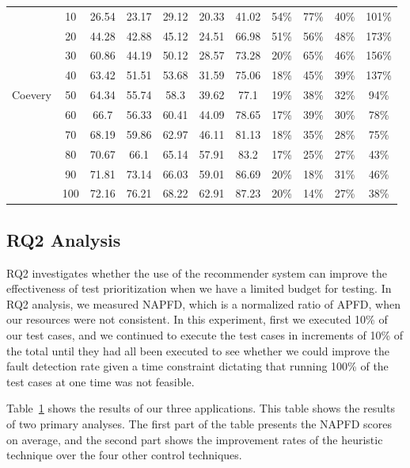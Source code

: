 \begin{table}[!ht]
\begin{center}
\begin{tabular}{|c|c|c|c|c|c|c||c|c|c|c|}
&10	&26.54	&23.17	&29.12	&20.33	&41.02	&54\%	&77\%	&40\%&	101\%	\\
&20	&44.28	&42.88	&45.12	&24.51	&66.98	&51\%	&56\%	&48\%	&173\%\\
&30	&60.86	&44.19	&50.12	&28.57	&73.28	&20\%	&65\%	&46\%	&156\%	\\
&40	&63.42	&51.51	&53.68	&31.59	&75.06	&18\%	&45\%	&39\%	&137\%	\\
Coevery &50	&64.34	&55.74	&58.3	&39.62	&77.1	&19\%	&38\% 	&32\%&	94\%	\\
&60	&66.7	&56.33	&60.41	&44.09	&78.65	&17\%	&39\% 	&30\%	&78\%\\
&70	&68.19	&59.86	&62.97	&46.11	&81.13	&18\%	&35\%	&28\%	&75\%	\\
&80	&70.67	&66.1	&65.14	&57.91	&83.2	&17\%	&25\%	&27\%	&43\%	\\
&90	&71.81	&73.14	&66.03	&59.01	&86.69	&20\%	&18\%	&31\%	&46\%	\\
&100	&72.16	&76.21	&68.22	&62.91	&87.23	&20\%	&14\% 	&27\%	&38\%	\\\hline 

\end{tabular}
\end {center}
\label{tab:napfd}
\vspace*{-5pt}
\end{table}

\subsection{RQ2 Analysis}

RQ2 investigates whether the use of the recommender system can improve the effectiveness
of test prioritization when we have a limited budget for testing. 
In RQ2 analysis, we measured NAPFD, which is a normalized ratio of APFD, when 
our resources were not consistent.
In this experiment, first we executed 10\% of our test cases, and we continued to execute the
test cases in increments of 10\% of the total until they had all been  
executed to see whether we could improve the fault detection rate given a 
time constraint dictating that running 100\% of the test cases at one time was not feasible. 

Table~\ref{tab:napfd} shows the results of our three applications.
This table shows the results of two primary analyses. The first part of the table 
presents the NAPFD scores on average, and the second part shows the 
improvement rates of the heuristic technique over the four other control techniques. 

